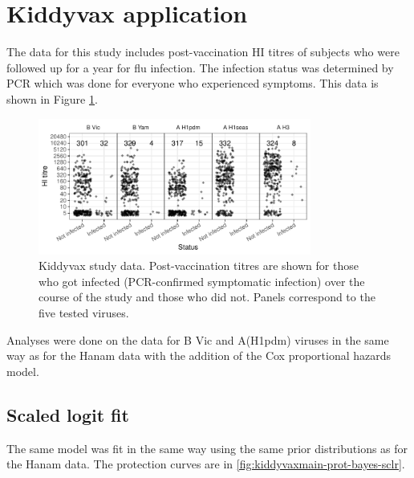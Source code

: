 \documentclass[12pt]{article}
\begin{document}
\pagebreak
%
\section{Kiddyvax application}

The data for this study includes post-vaccination HI titres of subjects who were followed up for a year for flu infection. The infection status was determined by PCR which was done for everyone who experienced symptoms. This data is shown in Figure \ref{fig:kiddyvax-main-titre}.

\begin{figure}[htp]
	\centering
	\includegraphics[width=0.8\textwidth]{../data-plot/kiddyvax-main-titre.pdf}
	\caption{
	Kiddyvax study data. Post-vaccination titres are shown for those who got infected (PCR-confirmed symptomatic infection) over the course of the study and those who did not. Panels correspond to the five tested viruses.
	}
	\label{fig:kiddyvax-main-titre}
\end{figure}

Analyses were done on the data for B Vic and A(H1pdm) viruses in the same way as for the Hanam data with the addition of the Cox proportional hazards model.

\subsection{Scaled logit fit}

The same model was fit in the same way using the same prior distributions as for the Hanam data. The protection curves are in \ref{fig:kiddyvaxmain-prot-bayes-sclr}.
\end{document}

